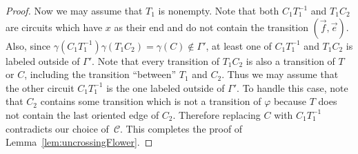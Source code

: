 \documentclass[11pt]{article}
\theoremstyle{definition}
\newcommand{\C}{\mathcal{C}}
\begin{document}
\begin{proof}
    Now we may assume that $T_1$ is nonempty. Note that both $C_1 T_1^{-1}$ and $T_1 C_2$ are circuits which have $x$ as their end and do not contain the transition $(\vec{f}, \vec{e})$. Also, since $\gamma(C_1 T_1^{-1})\gamma(T_1 C_2) = \gamma(C) \not\in\Gamma'$, at least one of $C_1 T_1^{-1}$ and $T_1 C_2$ is labeled outside of $\Gamma'$. Note that every transition of $T_1 C_2$ is also a transition of $T$ or $C$, including the transition ``between'' $T_1$ and $C_2$. Thus we may assume that the other circuit $C_1 T_1^{-1}$ is the one labeled outside of $\Gamma'$. To handle this case, note that $C_2$ contains some transition which is not a transition of $\varphi$ because $T$ does not contain the last oriented edge of $C_2$. Therefore replacing $C$ with $C_1 T_1^{-1}$ contradicts our choice of~$\C$. This completes the proof of Lemma~\ref{lem:uncrossingFlower}.

\end{proof}
\end{document}
